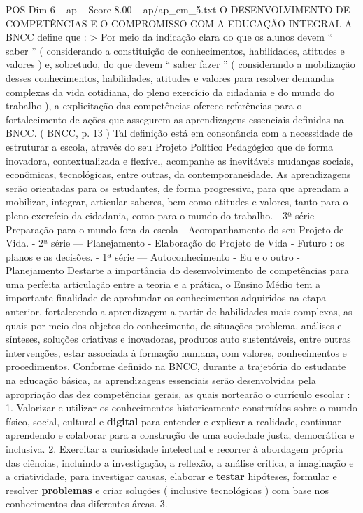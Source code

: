 \begin{textsample}{POS Dim 6 – ap – Score 8.00 – ap/ap\_em\_5.txt}  \label{ex:f6_pos_108}
O DESENVOLVIMENTO DE COMPETÊNCIAS E O COMPROMISSO COM A EDUCAÇÃO INTEGRAL A BNCC define que : > Por meio da indicação clara do que os alunos devem “ saber ” ( considerando a constituição de conhecimentos, habilidades, atitudes e valores ) e, sobretudo, do que devem “ saber fazer ” ( considerando a mobilização desses conhecimentos, habilidades, atitudes e valores para resolver demandas complexas da vida cotidiana, do pleno exercício da cidadania e do mundo do trabalho ), a explicitação das competências oferece referências para o fortalecimento de ações que assegurem as aprendizagens essenciais definidas na BNCC. ( BNCC, p. 13 ) Tal definição está em consonância com a necessidade de estruturar a escola, através do seu Projeto Político Pedagógico que de forma inovadora, contextualizada e flexível, acompanhe as inevitáveis mudanças sociais, econômicas, tecnológicas, entre outras, da contemporaneidade.
As aprendizagens serão orientadas para os estudantes, de forma progressiva, para que aprendam a mobilizar, integrar, articular saberes, bem como atitudes e valores, tanto para o pleno exercício da cidadania, como para o mundo do trabalho. - 3ª série — Preparação para o mundo fora da escola - Acompanhamento do seu Projeto de Vida. - 2ª série — Planejamento - Elaboração do Projeto de Vida - Futuro : os planos e as decisões. - 1ª série — Autoconhecimento - Eu e o outro - Planejamento Destarte a importância do desenvolvimento de competências para uma perfeita articulação entre a teoria e a prática, o Ensino Médio tem a importante finalidade de aprofundar os conhecimentos adquiridos na etapa anterior, fortalecendo a aprendizagem a partir de habilidades mais complexas, as quais por meio dos objetos do conhecimento, de situações-problema, análises e sínteses, soluções criativas e inovadoras, produtos auto sustentáveis, entre outras intervenções, estar associada à formação humana, com valores, conhecimentos e procedimentos.
Conforme definido na BNCC, durante a trajetória do estudante na educação básica, as aprendizagens essenciais serão desenvolvidas pela apropriação das dez competências gerais, as quais nortearão o currículo escolar : 1.
Valorizar e utilizar os conhecimentos historicamente construídos sobre o mundo físico, social, cultural e \textbf{digital} para entender e explicar a realidade, continuar aprendendo e colaborar para a construção de uma sociedade justa, democrática e inclusiva. 2.
Exercitar a curiosidade intelectual e recorrer à abordagem própria das ciências, incluindo a investigação, a reflexão, a análise crítica, a imaginação e a criatividade, para investigar causas, elaborar e \textbf{testar} hipóteses, formular e resolver \textbf{problemas} e criar soluções ( inclusive tecnológicas ) com base nos conhecimentos das diferentes áreas. 3.

\end{textsample}
